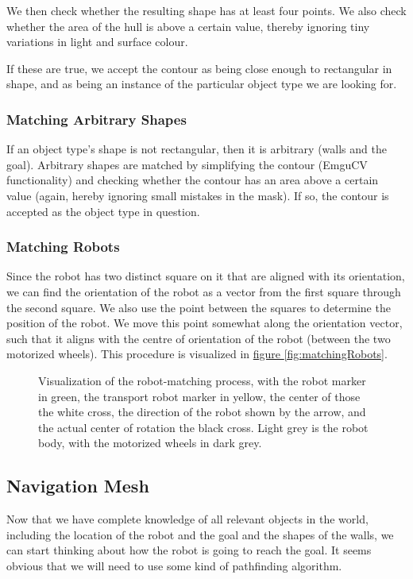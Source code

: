 \documentclass[10pt, abstracton, twocolumn]{scrartcl}
\newcommand{\fref}[1]{\hyperref[#1]{figure \vref{#1}}}
\begin{document}
We then check whether the resulting shape has at least four points. We also check whether the area of the hull is above a certain value, thereby ignoring tiny variations in light and surface colour.

If these are true, we accept the contour as being close enough to rectangular in shape, and as being an instance of the particular object type we are looking for. 

\subsubsection{Matching Arbitrary Shapes}
If an object type's shape is not rectangular, then it is arbitrary (walls and the goal). Arbitrary shapes are matched by simplifying the contour (EmguCV functionality) and checking whether the contour has an area above a certain value (again, hereby ignoring small mistakes in the mask). If so, the contour is accepted as the object type in question.

\subsubsection{Matching Robots}
Since the robot has two distinct square on it that are aligned with its orientation, we can find the orientation of the robot as a vector from the first square through the second square. We also use the point between the squares to determine the position of the robot. We move this point somewhat along the orientation vector, such that it aligns with the centre of orientation of the robot (between the two motorized wheels). This procedure is visualized in \fref{fig:matchingRobots}.

\begin{figure}
        \centering
        
        \caption{\small Visualization of the robot-matching process, with the robot marker in green, the transport robot marker in yellow, the center of those the white cross, the direction of the robot shown by the arrow, and the actual center of rotation the black cross. Light grey is the robot body, with the motorized wheels in dark grey.}
        \label{fig:matchingRobots}
\end{figure}

\subsection{Navigation Mesh}
Now that we have complete knowledge of all relevant objects in the world, including the location of the robot and the goal and the shapes of the walls, we can start thinking about how the robot is going to reach the goal. It seems obvious that we will need to use some kind of pathfinding algorithm.
\end{document}
